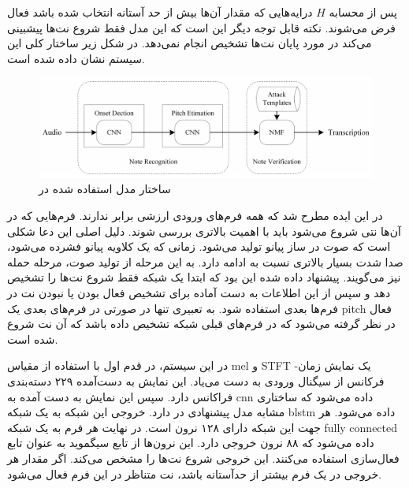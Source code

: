 پس از محسابه $H$ درایه‌هایی که مقدار آن‌ها بیش از حد آستانه انتخاب شده باشد فعال
فرض می‌شوند. نکته قابل توجه دیگر این است که این مدل فقط شروع نت‌ها پیشبینی
می‌کند در مورد پایان نت‌ها تشخیص انجام نمی‌دهد. در شکل زیر ساختار کلی این سیستم
نشان داده شده است.
\begin{figure}[ht]
    \centering
    \includegraphics[width=12cm]{./statics/wang2017two_architecture.png}
    \caption{ساختار مدل استفاده شده در \cite{wang2017two}}
\end{figure}

در \cite{hawthorne2017onsets} این ایده مطرح شد که همه فرم‌‌های ورودی ارزشی برابر
ندارند. فرم‌هایی که در آن‌ها نتی شروع می‌شود باید با اهمیت بالاتری بررسی شوند.
دلیل اصلی این دعا شکلی است که صوت در ساز پیانو تولید می‌شود. زمانی که یک کلاویه
پیانو فشرده می‌شود، صدا شدت بسیار بالاتری نسبت به ادامه دارد. به این مرحله از
تولید صوت، مرحله حمله نیز می‌گویند. پیشنهاد داده شده این بود که ابتدا یک شبکه
فقط شروع نت‌ها را تشخیص دهد و سپس از این اطلاعات به دست آماده برای تشخیص فعال
بودن یا نبودن نت‌ در فرم‌ها بعدی استفاده شود. به تعبیری تنها در صورتی در فرم‌های
بعدی یک \gls{pitch} فعال در نظر گرفته می‌شود که در فرم‌های قبلی شبکه تشخیص داده
باشد که آن نت شروع شده است.

در این سیستم، در قدم اول با استفاده از مقیاس mel و \gls{STFT} یک نمایش
زمان-فرکانس از سیگنال ورودی به دست می‌یاد. این نمایش به دست‌آمده ۲۲۹ دسته‌بندی
فراکانس دارد. سپس این نمایش به دست آمده به \gls{cnn} داده می‌شود که ساختاری
مشابه مدل پیشنهادی در \cite{kelz2016potential} دارد. خروجی این شبکه به یک شبکه
\gls{blstm} داده می‌شود. هر جهت این شبکه دارای ۱۲۸ نرون است. در نهایت هر فرم به
یک شبکه \gls{fully connected} داده می‌شود که ۸۸ نرون خروجی دارد. این نرون‌ها از
تابع سیگموید به عنوان تابع فعال‌سازی استفاده می‌کنند. این خروجی شروع نت‌ها را
مشخص می‌کند. اگر مقدار هر خروجی در یک فرم بیشتر از حدآستانه باشد، نت متناظر در
این فرم فعال می‌شود.

